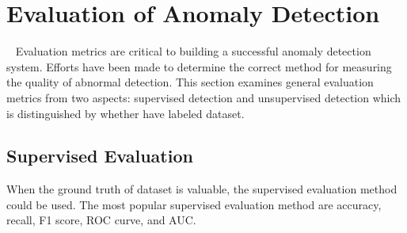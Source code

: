 
\section{Evaluation of Anomaly Detection}~\label{sec:evaluate}
Evaluation metrics are critical to building a
successful anomaly detection system.
Efforts have been made to determine the
correct method for measuring the quality of abnormal detection.
This section examines general evaluation metrics from two aspects:
supervised detection
and unsupervised detection which is
distinguished by whether have labeled dataset.

\subsection{Supervised Evaluation}
When the ground truth of dataset is valuable,
the supervised evaluation method could be used.
The most popular supervised evaluation method
are accuracy, 
recall,
F1 score,
ROC curve,
and AUC.

